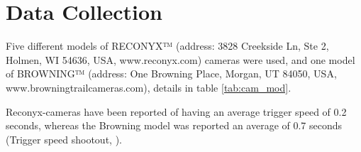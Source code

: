 




\section{Data Collection} %

Five different models of RECONYX™ (address: 3828 Creekside Ln, Ste 2, Holmen, WI 54636, USA, www.reconyx.com) cameras were used, 
and one model of BROWNING™ (address: One Browning Place, Morgan, UT 84050, USA, www.browningtrailcameras.com), details in table \ref{tab:cam_mod}.

Reconyx-cameras have been reported of having an average trigger speed of 0.2 seconds, whereas the Browning model was reported an average of 0.7 seconds (Trigger speed shootout, \cite{Trailcampro2014}).


